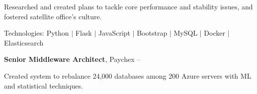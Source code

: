 \documentclass[MMMMyyyy,nonstopmode]{simpleresumecv_stacked}
\newcommand{\tech}[1]{\Gap\textrm{Technologies:} #1}
\newif\ifLOCATION
\begin{document}
\begin{Body}
\begin{Detail}

Researched and created plans to tackle core performance and stability issues, and fostered satellite office's culture.


\tech{Python $|$ Flask $|$ JavaScript $|$ Bootstrap $|$ MySQL $|$ Docker $|$ Elasticsearch}

\end{Detail}

\BigGap


\Entry
\textbf{Senior Middleware Architect}, Paychex
\hfill
{} -- 

\ifLOCATION
\hfill
Rochester, New York
\fi

\Gap
\begin{Detail}
\iffalse
At Paychex I worked with multiple cross-functional teams to build: an inventory system to track hosts, JVMs, and databases; machine learning systems in Python to efficiently rebalance databases and predict system utilization; custom Chaos Monkey ro randomly terminate process to find configuration weaknesses; and implemented AppDynamics on over 20,000 JVMs.
\fi

\iftrue
\BulletItem
Created system to rebalance 24,000 databases among 200 Azure servers with ML and statistical techniques.



\end{Detail}
\end{Body}
\end{document}
